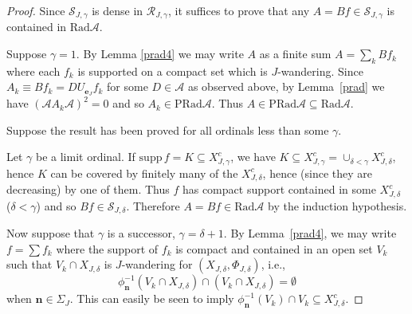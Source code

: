 \documentclass[12pt]{amsart}
\theoremstyle{definition}
\newcommand{\mcA}{\mathcal{A}}
\newcommand{\mcR}{\mathcal{R}}
\newcommand{\rad}{\mathrm{Rad}}
\newcommand{\bo}[1]{\mathbf{#1}}
\newcommand{\bon}{\mathbf{n}}
\begin{document}
\begin{proof}
Since $\mathcal{S}_{J,\gamma }$ is dense in $\mcR_{J,\gamma}$,
it suffices to prove that any $A=Bf\in \mathcal{S}_{J,\gamma} $
is contained in $\mathrm{Rad}\mathcal{A}$.

Suppose $\gamma =1.$ By Lemma \ref{prad4}  we may write
$A$ as a finite sum $A=\sum_k Bf_{k}$ where
each $f_{k}$ is supported on a compact set which is
$J$-wandering.
Since $A_{k}\equiv B f_{k}=D U_{\bo{e}_J} f_{k}$ for
some $D\in \mcA$ as observed above, by Lemma~\ref{prad} we have
$(\mathcal{A}A_{k}\mathcal{A})^2=0$ and so
$A_{k}\in \mathrm{PRad}\mathcal{A}$.
Thus $A\in \mathrm{PRad}\mathcal{A} \subseteq \rad\mcA$.

Suppose the result has been proved for all ordinals less than some
$\gamma$.

Let $\gamma $ be a limit ordinal.
If $\mathrm{supp}\, f=K\subseteq X_{J,\gamma }^{c}$, we have
$K\subseteq X_{J,\gamma }^{c}=
\cup_{\delta <\gamma}X_{J,\delta }^{c}$, hence $K$ can be covered by
finitely many of the $X_{J,\delta }^{c}$, hence (since they are
decreasing) by one of them. Thus $f$ has compact support contained
in some $X_{J,\delta }^{c}$ ($\delta <\gamma $) and so
$Bf \in \mathcal{S}_{J,\delta }$.
Therefore $A=Bf\in \mathrm{Rad}\mathcal{A}$ by the induction
hypothesis.

Now suppose that $\gamma$ is a successor, $\gamma =\delta +1$.
By Lemma~\ref{prad4}, we may write $f=\sum f_{k}$ where the support
of $f_{k}$ is compact and
contained in an open set $V_k$ such that
$V_{k}\cap X_{J,\delta }$ is $J$-wandering for
$(X_{J,\delta },\Phi_{J,\delta })$, i.e.,
\[ \phi _{\bon}^{-1}(V_{k}\cap X_{J,\delta })\cap
    (V_{k}\cap X_{J,\delta})=\emptyset
\]
when $\bon \in \Sigma_J$. 
This can easily be seen to imply
$\phi_{\bon}^{-1}(V_{k})\cap 
V_{k}\subseteq X_{J,\delta }^c$.
\begin{comment}
\footnote{(Delete before submitting)
For, if $y\in X_{J,\delta }$ and also
$y\in \phi _{\bon}^{-1}(V_k)\cap V_k$ then
$\phi _{\bon}(y)\in V_k$ and $\phi _{\bon}(y)\in X_{J,\delta }$
(since $X_{J,\delta }$ is invariant) so that
$\phi _{\bon}(y)\in X_{J,\delta }\cap V_k$; thus
$y\in (\phi_{\bon}^{-1}(X_{J,\delta }\cap V_k))\cap X_{J,\delta }\cap V_k$
contradicting the fact that $V_k\cap X_{J,\delta }$ is $J$-wandering
for $(X_{J,\delta },\Phi_{J,\delta })$.}
\end{comment}


\end{proof}
\end{document}
